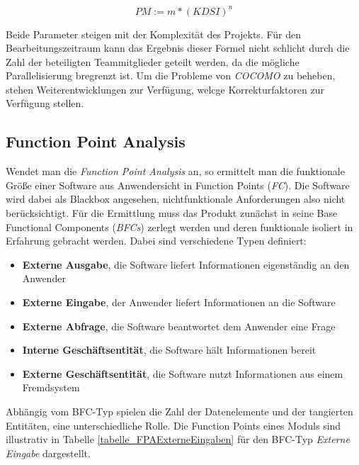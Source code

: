 $$PM := m * (KDSI)^n$$

Beide Parameter steigen mit der Komplexität des Projekts. Für den Bearbeitungszeitraum kann das Ergebnis dieser Formel nicht schlicht durch die Zahl der beteiligten Teammitglieder geteilt werden, da die mögliche Parallelisierung bregrenzt ist. Um die Probleme von \textit{COCOMO} zu beheben, stehen Weiterentwicklungen zur Verfügung, welcge Korrekturfaktoren zur Verfügung stellen.

\subsection{Function Point Analysis}
Wendet man die \textit{Function Point Analysis} an, so ermittelt man die funktionale Größe einer Software aus Anwendersicht in Function Points (\textit{FC}). Die Software wird dabei als Blackbox angesehen, nichtfunktionale Anforderungen also nicht berücksichtigt. Für die Ermittlung muss das Produkt zunächst in seine Base Functional Components (\textit{BFCs}) zerlegt werden und deren funktionale isoliert in Erfahrung gebracht werden. Dabei sind verschiedene Typen definiert:

\begin{itemize}
    \item \textbf{Externe Ausgabe}, die Software liefert Informationen eigenständig an den Anwender
    \item \textbf{Externe Eingabe}, der Anwender liefert Informationen an die Software
    \item \textbf{Externe Abfrage}, die Software beantwortet dem Anwender eine Frage
    \item \textbf{Interne Geschäftsentität}, die Software hält Informationen bereit
    \item \textbf{Externe Geschäftsentität}, die Software nutzt Informationen aus einem Fremdsystem
\end{itemize}

Abhängig vom BFC-Typ spielen die Zahl der Datenelemente und der tangierten Entitäten, eine unterschiedliche Rolle. Die Function Points eines Moduls sind illustrativ in Tabelle \ref{tabelle_FPAExterneEingaben} für den BFC-Typ \textit{Externe Eingabe} dargestellt.


